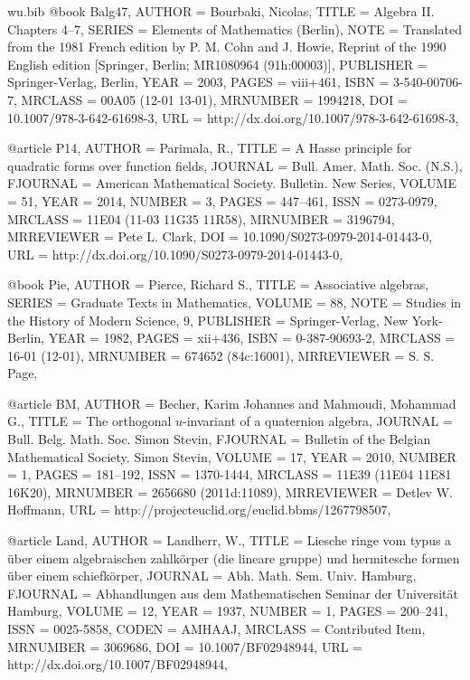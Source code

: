 \documentclass{amsart}
\numberwithin{equation}{section}
\theoremstyle{plain}
\theoremstyle{definition}
\begin{document}
\begin{filecontents}{wu.bib}
@book {Balg47, 
    AUTHOR = {Bourbaki, Nicolas},
     TITLE = {Algebra {II}. {C}hapters 4--7},
    SERIES = {Elements of Mathematics (Berlin)},
      NOTE = {Translated from the 1981 French edition by P. M. Cohn and J. Howie,
              Reprint of the 1990 English edition [Springer, Berlin;
              MR1080964 (91h:00003)]},
 PUBLISHER = {Springer-Verlag, Berlin},
      YEAR = {2003},
     PAGES = {viii+461},
      ISBN = {3-540-00706-7},
   MRCLASS = {00A05 (12-01 13-01)},
  MRNUMBER = {1994218},
       DOI = {10.1007/978-3-642-61698-3},
       URL = {http://dx.doi.org/10.1007/978-3-642-61698-3},
}

@article {P14, 
    AUTHOR = {Parimala, R.},
     TITLE = {A {H}asse principle for quadratic forms over function fields},
   JOURNAL = {Bull. Amer. Math. Soc. (N.S.)},
  FJOURNAL = {American Mathematical Society. Bulletin. New Series},
    VOLUME = {51},
      YEAR = {2014},
    NUMBER = {3},
     PAGES = {447--461},
      ISSN = {0273-0979},
   MRCLASS = {11E04 (11-03 11G35 11R58)},
  MRNUMBER = {3196794},
MRREVIEWER = {Pete L. Clark},
       DOI = {10.1090/S0273-0979-2014-01443-0},
       URL = {http://dx.doi.org/10.1090/S0273-0979-2014-01443-0},
}

@book {Pie, 
    AUTHOR = {Pierce, Richard S.},
     TITLE = {Associative algebras},
    SERIES = {Graduate Texts in Mathematics},
    VOLUME = {88},
      NOTE = {Studies in the History of Modern Science, 9},
 PUBLISHER = {Springer-Verlag, New York-Berlin},
      YEAR = {1982},
     PAGES = {xii+436},
      ISBN = {0-387-90693-2},
   MRCLASS = {16-01 (12-01)},
  MRNUMBER = {674652 (84c:16001)},
MRREVIEWER = {S. S. Page},
}

@article {BM, 
    AUTHOR = {Becher, Karim Johannes and Mahmoudi, Mohammad G.},
     TITLE = {The orthogonal {$u$}-invariant of a quaternion algebra},
   JOURNAL = {Bull. Belg. Math. Soc. Simon Stevin},
  FJOURNAL = {Bulletin of the Belgian Mathematical Society. Simon Stevin},
    VOLUME = {17},
      YEAR = {2010},
    NUMBER = {1},
     PAGES = {181--192},
      ISSN = {1370-1444},
   MRCLASS = {11E39 (11E04 11E81 16K20)},
  MRNUMBER = {2656680 (2011d:11089)},
MRREVIEWER = {Detlev W. Hoffmann},
       URL = {http://projecteuclid.org/euclid.bbms/1267798507},
}

@article {Land, 
    AUTHOR = {Landherr, W.},
     TITLE = {Liesche ringe vom typus a \"uber einem algebraischen
              zahlk\"orper (die lineare gruppe) und hermitesche formen
              \"uber einem schiefk\"orper},
   JOURNAL = {Abh. Math. Sem. Univ. Hamburg},
  FJOURNAL = {Abhandlungen aus dem Mathematischen Seminar der Universit\"at
              Hamburg},
    VOLUME = {12}, 
      YEAR = {1937},
    NUMBER = {1},
     PAGES = {200--241},
      ISSN = {0025-5858},
     CODEN = {AMHAAJ},
   MRCLASS = {Contributed Item},
  MRNUMBER = {3069686},
       DOI = {10.1007/BF02948944},
       URL = {http://dx.doi.org/10.1007/BF02948944},
}


\end{filecontents}
\end{document}
